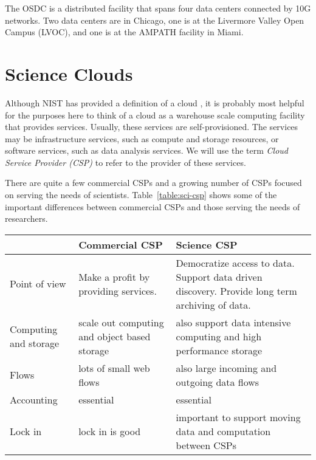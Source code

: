 \documentclass[11pt,twocolumn]{article}
\begin{document}
The OSDC is a distributed facility that spans four data centers
connected by 10G networks.  Two data centers are in Chicago, one is at
the Livermore Valley Open Campus (LVOC), and one is at the AMPATH
facility in Miami.


\section{Science Clouds}
Although NIST has provided a definition of a cloud \cite{Mell:2011}, it is probably most helpful for
the purposes here to think of a cloud as a warehouse scale computing facility \cite{Barroso:2009} that
provides services.  Usually, these services are self-provisioned.  The services may be infrastructure 
services, such as compute and storage resources, or software services, such as data analysis services.
We will use the term {\em Cloud Service Provider (CSP)} to refer to the provider of these services.

There are quite a few commercial CSPs and a growing number of CSPs focused on serving the needs
of scientists.  Table~\ref{table:sci-csp} shows some of the important differences between commercial
CSPs and those serving the needs of researchers.

\begin{table*}[ht]
\begin{center}
\begin{tabular}{|p{1.0in}|p{2.0in}|p{2.0in}|}\hline
& {\bf Commercial CSP} & {\bf Science CSP} \\ \hline
Point of view & Make a profit by providing services.  
& Democratize access to data. Support data driven discovery.  Provide long term archiving of data.  \\ \hline
Computing and storage & scale out computing and object based storage & also support data intensive computing 
and high performance storage \\ \hline
Flows & lots of small web flows & also large incoming and outgoing data flows \\ \hline
Accounting & essential & essential \\ \hline
Lock in & lock in is good & important to support moving data and computation between CSPs \\ \hline
\end{tabular}
\end{center}
\caption{Some of the differences between Commercial CSPs and Science CSP serving the research community.}
\label{table:sci-csp}
\end{table*}
\end{document}
